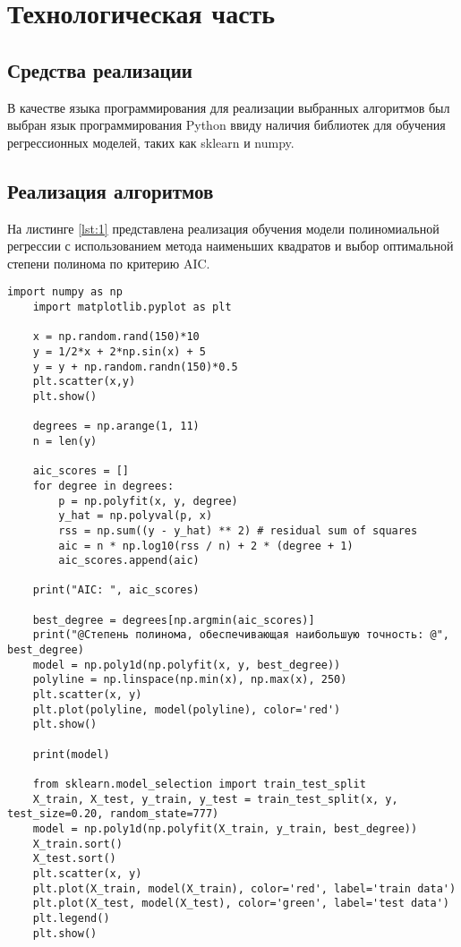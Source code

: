 \chapter{Технологическая часть}

\section{Средства реализации}

В качестве языка программирования для реализации выбранных алгоритмов был выбран язык программирования Python ввиду наличия библиотек для обучения регрессионных моделей, таких как sklearn и numpy.

\section{Реализация алгоритмов}

На листинге \ref{lst:1} представлена реализация обучения модели полиномиальной регрессии с использованием метода наименьших квадратов и выбор оптимальной степени полинома по критерию AIC.

\begin{lstlisting}[label=lst:1,caption=Обучение модели полиномиальной регрессии и выбор оптимальной степени полинома]
	import numpy as np
	import matplotlib.pyplot as plt
	
	x = np.random.rand(150)*10
	y = 1/2*x + 2*np.sin(x) + 5
	y = y + np.random.randn(150)*0.5
	plt.scatter(x,y)
	plt.show()
	
	degrees = np.arange(1, 11)
	n = len(y)
	
	aic_scores = []
	for degree in degrees:
		p = np.polyfit(x, y, degree)
		y_hat = np.polyval(p, x)
		rss = np.sum((y - y_hat) ** 2) # residual sum of squares
		aic = n * np.log10(rss / n) + 2 * (degree + 1)
		aic_scores.append(aic)
	
	print("AIC: ", aic_scores)
	
	best_degree = degrees[np.argmin(aic_scores)]
	print("@Степень полинома, обеспечивающая наибольшую точность: @", best_degree)
	model = np.poly1d(np.polyfit(x, y, best_degree))
	polyline = np.linspace(np.min(x), np.max(x), 250)
	plt.scatter(x, y)
	plt.plot(polyline, model(polyline), color='red')
	plt.show()
	
	print(model)
	
	from sklearn.model_selection import train_test_split
	X_train, X_test, y_train, y_test = train_test_split(x, y, test_size=0.20, random_state=777)
	model = np.poly1d(np.polyfit(X_train, y_train, best_degree))
	X_train.sort()
	X_test.sort()
	plt.scatter(x, y)
	plt.plot(X_train, model(X_train), color='red', label='train data')
	plt.plot(X_test, model(X_test), color='green', label='test data')
	plt.legend()
	plt.show()
\end{lstlisting}


